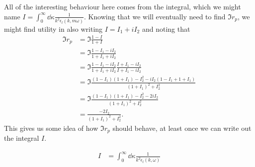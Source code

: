 \documentclass[../../main.tex]{subfiles}
\begin{document}
All of the interesting behaviour here comes from the integral, which we might name $I = \int_0^\infty \dd{\kappa} \frac{1}{k^2 \epsilon_l(k,m \omega)}$. Knowing that we will eventually need to find $\Im r_p$, we might find utility in also writing $I = I_1 + i I_2$ and noting that
\begin{align}
	\Im r_p &= \Im \frac{1 - I}{1 + I} \\
	&= \Im \frac{1 - I_1 - i I_2}{1 + I_1 + i I_2} \\
	&= \Im \frac{1 - I_1 - i I_2}{1 + I_1 + i I_2} \frac{I + I_1 - i I_2}{I + I_1 - i I_2} \\
	&= \Im \frac{(1 - I_1)(1 + I_1) - I_2^2 - i I_2(1 - I_1 + 1 + I_1)}{(1 + I_1)^2 + I_2^2} \\
	&= \Im \frac{(1 - I_1)(1 + I_1) - I_2^2 - 2 i I_2}{(1 + I_1)^2 + I_2^2} \\
	&= \frac{- 2 I_2}{(1 + I_1)^2 + I_2^2}.
\end{align}
This gives us some idea of how $\Im r_p$ should behave, at least once we can write out the integral $I$.

\begin{align}
	I &= \int_0^\infty \dd{\kappa} \frac{1}{k^2 \epsilon_l(k, \omega)}
\end{align}
\end{document}
